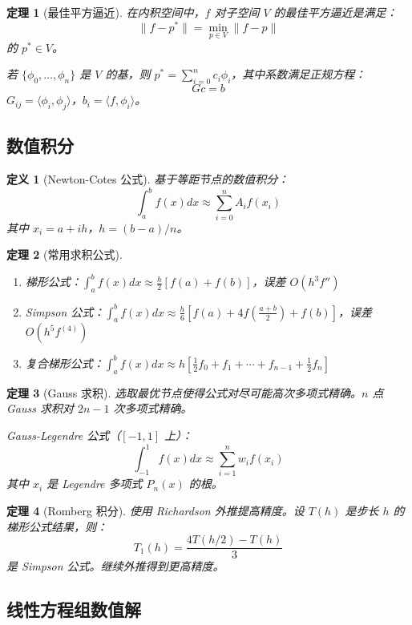 \documentclass[12pt]{article}
\newtheorem{theorem}{定理}[section]
\newtheorem{definition}{定义}[section]
\begin{document}
\begin{theorem}[最佳平方逼近]
在内积空间中，$f$ 对子空间 $V$ 的最佳平方逼近是满足：
$$\|f - p^*\| = \min_{p \in V} \|f - p\|$$
的 $p^* \in V$。

若 $\{\phi_0, \ldots, \phi_n\}$ 是 $V$ 的基，则 $p^* = \sum_{i=0}^{n} c_i \phi_i$，其中系数满足正规方程：
$$Gc = b$$
$G_{ij} = \langle \phi_i, \phi_j \rangle$，$b_i = \langle f, \phi_i \rangle$。
\end{theorem}

\subsection{数值积分}

\begin{definition}[Newton-Cotes 公式]
基于等距节点的数值积分：
$$\int_a^b f(x) dx \approx \sum_{i=0}^{n} A_i f(x_i)$$
其中 $x_i = a + ih$，$h = (b-a)/n$。
\end{definition}

\begin{theorem}[常用求积公式]
\begin{enumerate}
\item 梯形公式：$\int_a^b f(x) dx \approx \frac{h}{2}[f(a) + f(b)]$，误差 $O(h^3f'')$
\item Simpson 公式：$\int_a^b f(x) dx \approx \frac{h}{6}[f(a) + 4f(\frac{a+b}{2}) + f(b)]$，误差 $O(h^5f^{(4)})$
\item 复合梯形公式：$\int_a^b f(x) dx \approx h[\frac{1}{2}f_0 + f_1 + \cdots + f_{n-1} + \frac{1}{2}f_n]$
\end{enumerate}
\end{theorem}

\begin{theorem}[Gauss 求积]
选取最优节点使得公式对尽可能高次多项式精确。$n$ 点 Gauss 求积对 $2n-1$ 次多项式精确。

Gauss-Legendre 公式（$[-1, 1]$ 上）：
$$\int_{-1}^{1} f(x) dx \approx \sum_{i=1}^{n} w_i f(x_i)$$
其中 $x_i$ 是 Legendre 多项式 $P_n(x)$ 的根。
\end{theorem}

\begin{theorem}[Romberg 积分]
使用 Richardson 外推提高精度。设 $T(h)$ 是步长 $h$ 的梯形公式结果，则：
$$T_1(h) = \frac{4T(h/2) - T(h)}{3}$$
是 Simpson 公式。继续外推得到更高精度。
\end{theorem}

\subsection{线性方程组数值解}
\end{document}
